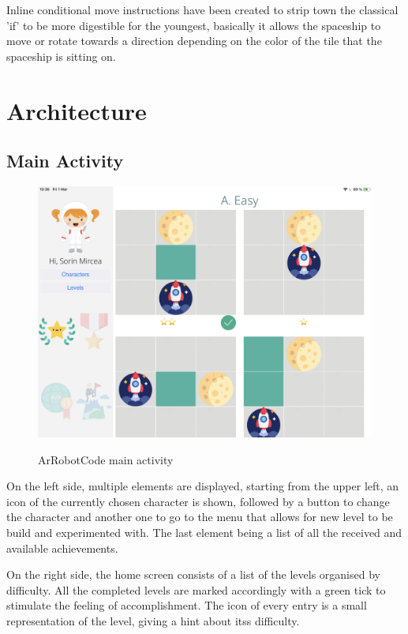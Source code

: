 \documentclass[12 pct]{report}
\begin{document}
Inline conditional move instructions have been created to strip town the classical 'if'  to be more digestible for the youngest, basically it allows the spaceship to move or rotate towards a direction depending on the color  of the tile that the spaceship is sitting on.
\section{Architecture}

\subsection*{Main Activity}
\begin{figure}[H]
\includegraphics[width=1.0\textwidth]{ArRobotCode0}
\centering
\label{fig:hololens}
\caption{ArRobotCode main activity}
\end{figure}

On the left side, multiple elements are displayed, starting from the upper left, an icon of the currently chosen character is shown, followed by a button to change the character and another one to go to the menu that allows for new level to be build and experimented with. The last element being a list of all the received and available achievements.

On the right side, the home screen consists of a list of the levels organised by difficulty. All the completed levels are marked accordingly with a green tick to stimulate the feeling of accomplishment. The icon of every entry is a small representation of the level, giving a hint about itss difficulty. 
\end{document}
